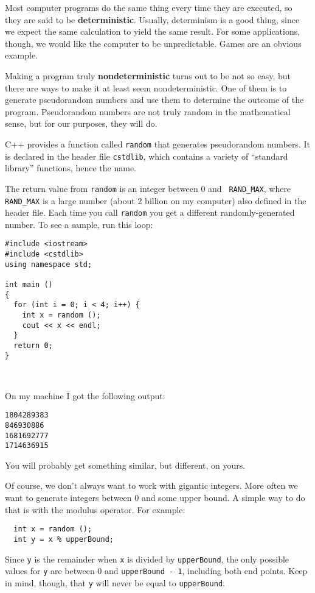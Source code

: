 Most computer programs do the same thing every time they are executed,
so they are said to be {\bf deterministic}.  Usually, determinism is a
good thing, since we expect the same calculation to yield the same
result.  For some applications, though, we would like the
computer to be unpredictable.  Games are an obvious example.

Making a program truly {\bf nondeterministic} turns out to be not
so easy, but there are ways to make it at least seem
nondeterministic.  One of them is to generate {pseudorandom} numbers and
use them to determine the outcome of the program.
Pseudorandom numbers
are not truly random in the mathematical sense, but 
for our purposes, they will do.

C++ provides a function called {\tt random} that generates
pseudorandom numbers.  It is declared in the
header file {\tt cstdlib}, which contains a variety of ``standard
library'' functions, hence the name.

The return value from {\tt random} is an integer between 0 and {\tt
RAND\_MAX}, where {\tt RAND\_MAX} is a large number (about 2 billion
on my computer) also defined in the header file.  Each time you call
{\tt random} you get a different randomly-generated number.  To see a
sample, run this loop:

\begin{verbatim}
#include <iostream>
#include <cstdlib>
using namespace std;

int main ()
{
  for (int i = 0; i < 4; i++) {
    int x = random ();
    cout << x << endl;
  }
  return 0;
}

  
\end{verbatim}
%
On my machine I got the following output:

\begin{verbatim}
1804289383
846930886
1681692777
1714636915
\end{verbatim}
%
You will probably get something similar, but different, on yours.

Of course, we don't always want to work with gigantic integers.
More often we want to generate integers between 0 and some
upper bound.  A simple way to do that is with the modulus
operator.  For example:

\begin{verbatim}
  int x = random ();
  int y = x % upperBound;
\end{verbatim}
%
Since {\tt y} is the remainder when {\tt x} is divided by
{\tt upperBound}, the only possible values for {\tt y}
are between 0 and {\tt upperBound - 1}, including both
end points.  Keep in mind, though, that {\tt y} will never
be equal to {\tt upperBound}.


